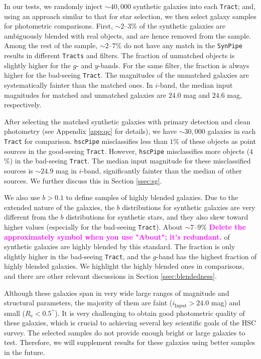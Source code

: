 \documentclass[useamsfonts]{pasj01}
\def\asec{$^{\prime\prime}$}
\def\hscpipe{\texttt{hscPipe}}
\def\synpipe{\texttt{SynPipe}}
\def\tract{\texttt{Tract}}
\def\tracts{\texttt{Tracts}}
\newcommand{\susan}[1]{\textcolor{magenta} {\textbf{#1}}}
\begin{document}
    In our tests, we randomly inject ${\sim}40,000$ synthetic galaxies into each 
    \tract{}; and, using an approach similar to that for star selection, we then select galaxy samples for photometric comparisons. 
    First, ${\sim}2$--$3$\% of the synthetic galaxies are ambiguously blended with 
    real objects, and are hence removed from the sample. 
    Among the rest of the sample, ${\sim}2$--$7$\% do not have any match in the 
    \synpipe{} results in different \tracts{} and filters. 
    The fraction of unmatched objects is slightly higher for the $g$- and $y$-bands. 
    For the same filter, the fraction is always higher for the bad-seeing \tract{}.
    The magnitudes of the unmatched galaxies are systematically fainter than the 
    matched ones. 
    In $i$-band, the median input magnitudes for matched and unmatched galaxies are 
    $24.0$ mag and $24.6$ mag, respectively. 
    
    After selecting the matched synthetic galaxies with primary detection and 
    clean photometry (see Appendix \ref{app:qc} for details), we have ${\sim}30,000$
    galaxies in each \tract{} for comparison.  
   \hscpipe{} misclassifies less than $1$\% of these objects as point sources 
    in the good-seeing \tract{}.  
    However,   \hscpipe{} misclassifies more objects ($4$\%) in the bad-seeing \tract{}.
    The median input magnitude for these misclassified sources is ${\sim}24.9$ mag 
    in $i$-band, significantly fainter than the median of other sources.  
    We further discuss this in Section \ref{ssec:sg}.
    
    We also use $b>0.1$ to define samples of highly blended galaxies.
    Due to the extended nature of the galaxies, the $b$ distributions for synthetic galaxies are 
    very different from the  $b$ distributions for synthetic stars, and they also skew toward higher values (especially for the 
    bad-seeing \tract{}). 
    About ${\sim}7$--$9$\% \susan{Delete the approximately symbol when you use "About"; it's redundant.} of synthetic galaxies are highly blended by this standard.
    The fraction is only slightly higher in the bad-seeing \tract{}, and the 
    $g$-band has the highest fraction of highly blended galaxies. 
    We highlight the highly blended ones in comparisons, and there are other relevant 
    discussions in Section \ref{ssec:blendedness}.
    
    Although these galaxies span in very wide large ranges of magnitude and 
    structural parameters, the majority of them are faint 
    ($i_{\mathrm{Input}} > 24.0$ mag) and small ($R_{\mathrm{e}} < 0.5$\asec). 
    It is very challenging to obtain good photometric quality of these galaxies, which is crucial
    to achieving several key scientific goals of the HSC survey. 
    The selected samples do not provide enough bright or large galaxies to test. 
    Therefore, we will supplement results for these galaxies using better samples 
    in the future. 
\end{document}
